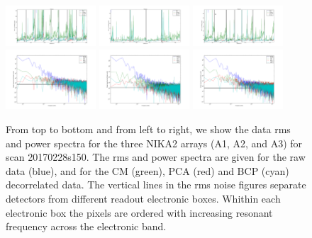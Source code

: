 \begin{figure}[ht] %
\begin{center}
\includegraphics[width=0.3\textwidth]{Figures/NoiseTests/rms_TOI_array_1_20170228s151.pdf}
\includegraphics[width=0.3\textwidth]{Figures/NoiseTests/rms_TOI_array_2_20170228s151.pdf}
\includegraphics[width=0.3\textwidth]{Figures/NoiseTests/rms_TOI_array_3_20170228s151.pdf}
\includegraphics[width=0.3\textwidth]{Figures/NoiseTests/pws_TOI_array_1_20170228s151.pdf}
\includegraphics[width=0.3\textwidth]{Figures/NoiseTests/pws_TOI_array_2_20170228s151.pdf}
\includegraphics[width=0.3\textwidth]{Figures/NoiseTests/pws_TOI_array_3_20170228s151.pdf}

\end{center}
\caption[Noise RMS and power spectra]{From top to bottom and from left to right, we show the data rms and power spectra for the three NIKA2 arrays (A1, A2, and A3) for scan 20170228s150. The rms and power spectra are given for the raw data (blue), and for the CM (green), PCA (red) and BCP (cyan) decorrelated data. The vertical lines in the rms noise figures separate detectors from different readout electronic boxes. Whithin each electronic box the pixels are ordered with increasing resonant frequency across the electronic band. \label{rmspws}}
\end{figure}

